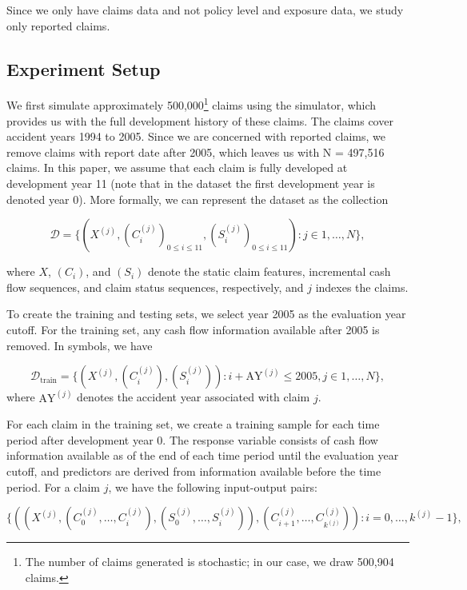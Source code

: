 \documentclass{article}
\begin{document}
Since we only have claims data and not policy level and exposure data, we study 
only reported claims.

\subsection{Experiment Setup}

We first simulate approximately 500,000\footnote{The number of claims generated
is stochastic; in our case, we draw 500,904 claims.} claims using the simulator,
which provides us with the full development history of these claims. The claims 
cover accident years 1994 to 2005. Since we are concerned with reported claims,
we remove claims with report date after 2005, which leaves us with N = 497,516 
claims. In this paper, we assume that each claim is fully developed at 
development year 11 (note that in the dataset the first development year is 
denoted year 0). More formally, we can represent the dataset as the collection

\begin{equation}
    \mathcal{D} = \{ (X^{(j)}, (C_i^{(j)})_{0 \leq i \leq 11}, (S_i^{(j)})_{0 \leq i \leq 11}): j\in {1,\dots, N}\},
\end{equation}

where $X$, $(C_i)$, and $(S_i)$ denote the static claim features, incremental 
cash flow sequences, and claim status sequences, respectively, and $j$ indexes 
the claims.

To create the training and testing sets, we select year 2005 as the evaluation 
year cutoff. For the training set, any cash flow information available after
2005 is removed. In symbols, we have

\begin{equation}
    \mathcal{D}_{\text{train}} = \{ (X^{(j)}, (C_i^{(j)}), (S_i^{(j)})): i + \text{AY}^{(j)} \leq 2005, j \in {1,\dots, N}\},
\end{equation}
where $\text{AY}^{(j)}$ denotes the accident year associated with claim $j$.

For each claim in the training set, we create a training sample for each time 
period after development year 0. The response variable consists of cash flow 
information available as of the end of each time period until the evaluation 
year cutoff, and predictors are derived from information available before the
time period. For a claim $j$, we have the following input-output pairs:

\begin{equation}\label{eq:training-samples}
    \{((X^{(j)}, (C_0^{(j)}, \dots, C_i^{(j)}), (S_0^{(j)}, \dots, S_i^{(j)})), (C_{i+1}^{(j)}, \dots, C_{k^{(j)}}^{(j)})): i = 0, \dots, k^{(j)} - 1\},
\end{equation}
\end{document}
